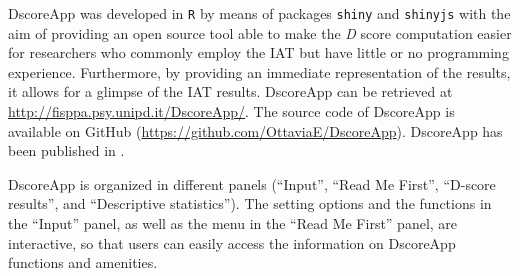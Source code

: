 \documentclass[12pt]{book}
\begin{document}


DscoreApp \cite{dscoreapp} was developed in \verb*|R| by means of packages \verb*|shiny| \cite{shiny} and \verb*|shinyjs| \cite{shinyjs} with the aim of providing an open source tool able to make the \emph{D} score computation easier for researchers who commonly employ the IAT but have little or no programming experience. Furthermore, by providing an immediate representation of the results, it allows for a glimpse of the IAT results. 
DscoreApp can be retrieved at  \url{http://fisppa.psy.unipd.it/DscoreApp/}. The source code of DscoreApp is available on GitHub 
 (\url{https://github.com/OttaviaE/DscoreApp}). DscoreApp has been published in .

DscoreApp is organized in different panels (``Input'', ``Read Me First'', ``D-score results'', and ``Descriptive statistics''). 
The setting options and the functions in the ``Input'' panel, as well as the menu in the ``Read Me First'' panel, are interactive, so that users can easily access the information on
DscoreApp functions and amenities.
\end{document}
